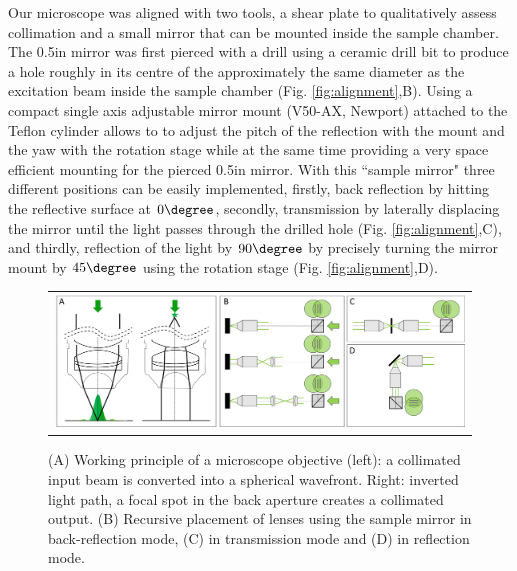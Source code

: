 \documentclass[12pt]{spieman}  %
\begin{document}
\begin{spacing}{2}
Our microscope was aligned with two tools, a shear plate to qualitatively assess collimation and a small mirror that can be mounted inside the sample chamber. The 0.5in mirror was first pierced with a drill using a ceramic drill bit to produce a hole roughly in its centre of the approximately the same diameter as the excitation beam inside the sample chamber (Fig. \ref{fig:alignment},B). Using a compact single axis adjustable mirror mount (V50-AX, Newport) attached to the Teflon cylinder allows to to adjust the pitch of the reflection with the mount and the yaw with the rotation stage while at the same time providing a very space efficient mounting for the pierced 0.5in mirror. With this ``sample mirror" three different positions can be easily implemented, firstly, back reflection by hitting the reflective surface at $0\degree$, secondly, transmission by laterally displacing the mirror until the light passes through the drilled hole (Fig. \ref{fig:alignment},C), and thirdly, reflection of the light by $90\degree$ by precisely turning the mirror mount by $45\degree$ using the rotation stage (Fig. \ref{fig:alignment},D). 

\begin{figure}
   \begin{center}
   \begin{tabular}{c}
   \includegraphics[width=\textwidth]{SOI2.eps}
   \end{tabular}
   \end{center}
   \caption{\label{fig:alignment2} (A) Working principle of a microscope objective (left): a collimated input beam is converted into a spherical wavefront. Right: inverted light path, a focal spot in the back aperture creates a collimated output. (B) Recursive placement of lenses using the sample mirror in back-reflection mode, (C) in transmission mode and (D) in reflection mode.} 
   \end{figure}


\end{spacing}
\end{document}
